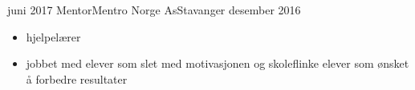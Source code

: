 \begin{experiences}
  \emptySeparator
  
  \simpleexperience
    {juni 2017}   {Mentor}{Mentro Norge As}{Stavanger}
    {desember 2016} {
                      \begin{itemize}
                        \item hjelpelærer
                        \item jobbet med  elever som slet med motivasjonen og skoleflinke elever som ønsket å forbedre resultater
                      \end{itemize}
                    }

  \emptySeparator
  
\end{experiences}
